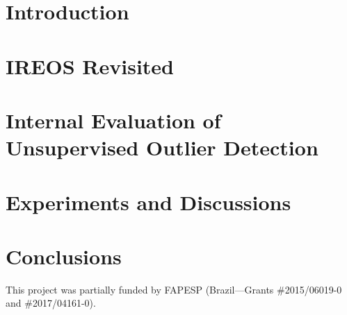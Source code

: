 
\section{Introduction}


\newpage
\section{IREOS Revisited}


\newpage
\section{Internal Evaluation of Unsupervised Outlier Detection}


\section{Experiments and Discussions}


\section{Conclusions}



\begin{acks}
This project was partially funded by FAPESP (Brazil---Grants \#2015/06019-0 and \#2017/04161-0).
\end{acks}




